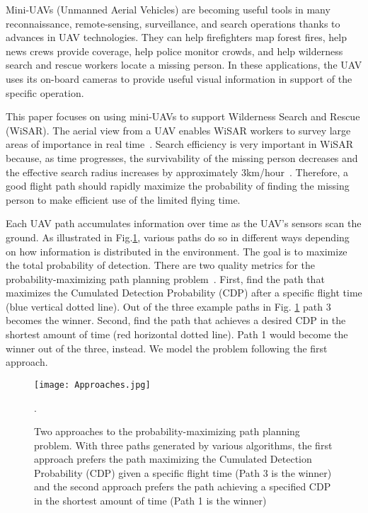 
Mini-UAVs (Unmanned Aerial Vehicles) are becoming useful tools in many reconnaissance, remote-sensing, surveillance, and search operations thanks to advances in UAV technologies. They can help firefighters map forest fires, help news crews provide coverage, help police monitor crowds, and help wilderness search and rescue workers locate a missing person. In these applications, the UAV uses its on-board cameras to provide useful visual information in support of the specific operation.

This paper focuses on using mini-UAVs to support Wilderness Search and Rescue (WiSAR). The aerial view from a UAV enables WiSAR workers to survey large areas of importance in real time~\cite{Goodrich2008Supporting}. Search efficiency is very important in WiSAR because, as time progresses, the survivability of the missing person decreases and the effective search radius increases by approximately 3km/hour~\cite{Syrotuck2000Introduction}. Therefore, a good flight path should rapidly maximize the probability of finding the missing person to make efficient use of the limited flying time.

Each UAV path accumulates information over time as the UAV's sensors scan the ground. As illustrated in Fig.\ref{TwoApproaches}, various paths do so in different ways depending on how information is distributed in the environment. The goal is to maximize the total probability of detection. There are two quality metrics for the probability-maximizing path planning problem~\cite{Koopman1957Theory, Stone1975Theory, Washburn1981Search}. First, find the path that maximizes the Cumulated Detection Probability (CDP) after a specific flight time (blue vertical dotted line). Out of the three example paths in Fig.
\ref{TwoApproaches} path 3 becomes the winner. Second, find the path that achieves a desired CDP in the shortest amount of time (red horizontal dotted line). Path 1 would become the winner out of the three, instead. We model the problem following the first approach.
\begin{figure}
\centering
\texttt{[image: Approaches.jpg]}
\caption[Two approaches to the probability-maximizing path planning problem]{Two approaches to the probability-maximizing path planning problem. With three paths generated by various algorithms, the first approach prefers the path maximizing the Cumulated Detection Probability (CDP) given a specific flight time (Path 3 is the winner) and the second approach prefers the path achieving a specified CDP in the shortest amount of time (Path 1 is the winner)}. 
\label{TwoApproaches}
\end{figure}

